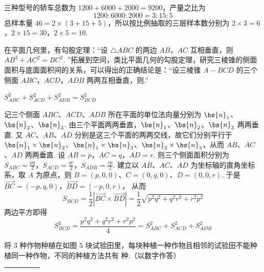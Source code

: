 \begin{solution}
三种型号的轿车总数为 \(1200+6000+2000=9200\)，产量之比为
\[
1200:6000:2000=3:15:5
\]
总样本量 \(46=2\times(3+15+5)\)，所以按比例抽取的三层样本数分别为
\(2\times3=6\)，\(2\times15=30\)，\(2\times5=10\).
\end{solution}

\begin{problem}
在平面几何里，有勾股定理：“设 \(\triangle ABC\) 的两边 \(AB\)，\(AC\) 互相垂直，则 \(AB^2 + AC^2 = BC^2\). ”拓展到空间，类比平面几何的勾股定理，研究三棱锥的侧面面积与底面面积间的关系，可以得出的正确结论是：“设三棱锥 \(A - BCD\) 的三个侧面 \(ABC\)，\(ACD\)，\(ADB\) 两两互相垂直，则\fillinblank{}.”
\end{problem}

\begin{answer}
\(S_{ABC}^{2} + S_{ACD}^{2} + S_{ADB}^{2} = S_{BCD}^{2}\)
\end{answer}

\begin{solution}
记三个侧面 \(ABC\)、\(ACD\)、\(ADB\) 所在平面的单位法向量分别为 \(\bs{n}_1\)、\(\bs{n}_2\)、\(\bs{n}_3\). 由三个平面两两垂直，\(\bs{n}_1\)、\(\bs{n}_2\)、\(\bs{n}_3\) 两两垂直. 又 \(AC\)、\(AB\)、\(AD\) 分别是这三个平面的两两交线，故它们分别平行于 \(\bs{n}_1\times\bs{n}_2\)、\(\bs{n}_1\times\bs{n}_3\)、\(\bs{n}_2\times\bs{n}_3\)，从而 \(AB\)、\(AC\)、\(AD\) 两两垂直. 设
\(AB=p\)，\(AC=q\)，\(AD=r\).
则三个侧面面积分别为
\(S_{ABC}=\frac{pq}{2}\)，\(S_{ACD}=\frac{qr}{2}\)，\(S_{ADB}=\frac{rp}{2}\).
建立以 \(AB\)、\(AC\)、\(AD\) 为坐标轴的直角坐标系，取 \(A\) 为原点，则 \(B=(p,0,0)\)、\(C=(0,q,0)\)、\(D=(0,0,r)\). 于是
\(\overrightarrow{BC}=(-p,q,0)\)，\(\overrightarrow{BD}=(-p,0,r)\)，
从而
\[
S_{BCD}
=\frac12\left|\overrightarrow{BC}\times\overrightarrow{BD}\right|
=\frac12\sqrt{p^2q^2+q^2r^2+r^2p^2}
\]
两边平方即得
\[
S_{BCD}^{2}
=\frac{p^2q^2+q^2r^2+r^2p^2}{4}
=S_{ABC}^{2}+S_{ACD}^{2}+S_{ADB}^{2}
\]
\end{solution}

\begin{problem}
将 \(3\) 种作物种植在如图 \(5\) 块试验田里，每块种植一种作物且相邻的试验田不能种植同一种作物，不同的种植方法共有\fillinblank{} 种.（以数字作答）

\begin{center}
\begin{tabular}{|c|c|c|c|c|}
\hline
\rule{2em}{0pt}\rule{0pt}{2em} &
\rule{2em}{0pt} &
\rule{2em}{0pt} &
\rule{2em}{0pt} &
\rule{2em}{0pt} \\
\hline
\end{tabular}
\end{center}
\end{problem}

